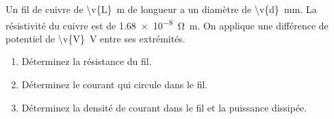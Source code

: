 Un fil de cuivre de \qty{\v{L}}{m} de longueur a un diamètre de \qty{\v{d}}{mm}. La résistivité du cuivre est de \qty{1.68e-8}{\ohm.m}. On applique une différence de potentiel de \qty{\v{V}}{V} entre ses extrémités.

\begin{enumerate}[label=\alph*)]
    \item Déterminez la résistance du fil.
    \item Déterminez le courant qui circule dans le fil.
    \item Déterminez la densité de courant dans le fil et la puissance dissipée.
\end{enumerate}
